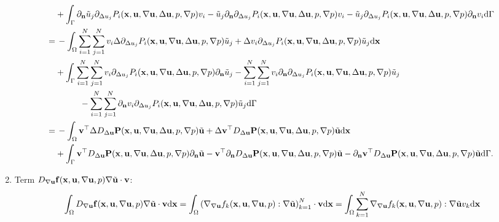 \documentclass[oneside]{book}
\numberwithin{equation}{section}
\begin{document}
\begin{enumerate}[leftmargin=0in]
\begin{align*}
        &+ \int_\Gamma \partial_{\bf n}\tilde{u}_j\partial_{\Delta u_j}P_i({\bf x},{\bf u},\nabla{\bf u},\Delta{\bf u},p,\nabla p)v_i - \tilde{u}_j\partial_{\bf n}\partial_{\Delta u_j}P_i({\bf x},{\bf u},\nabla{\bf u},\Delta{\bf u},p,\nabla p)v_i - \tilde{u}_j\partial_{\Delta u_j}P_i({\bf x},{\bf u},\nabla{\bf u},\Delta{\bf u},p,\nabla p)\partial_{\bf n}v_i{\rm d}\Gamma\\
        =&\, -\int_\Omega \sum_{i=1}^N\sum_{j=1}^N v_i\Delta\partial_{\Delta u_j}P_i({\bf x},{\bf u},\nabla{\bf u},\Delta{\bf u},p,\nabla p)\tilde{u}_j + \Delta v_i\partial_{\Delta u_j}P_i({\bf x},{\bf u},\nabla{\bf u},\Delta{\bf u},p,\nabla p)\tilde{u}_j{\rm d}{\bf x}\\
        &+ \int_\Gamma \sum_{i=1}^N\sum_{j=1}^N v_i\partial_{\Delta u_j}P_i({\bf x},{\bf u},\nabla{\bf u},\Delta{\bf u},p,\nabla p)\partial_{\bf n}\tilde{u}_j - \sum_{i=1}^N\sum_{j=1}^N v_i\partial_{\bf n}\partial_{\Delta u_j}P_i({\bf x},{\bf u},\nabla{\bf u},\Delta{\bf u},p,\nabla p)\tilde{u}_j\\
        &\hspace{1cm} - \sum_{i=1}^N\sum_{j=1}^N \partial_{\bf n}v_i\partial_{\Delta u_j}P_i({\bf x},{\bf u},\nabla{\bf u},\Delta{\bf u},p,\nabla p)\tilde{u}_j{\rm d}\Gamma\\
        =&\, -\int_\Omega {\bf v}^\top\Delta D_{\Delta{\bf u}}{\bf P}({\bf x},{\bf u},\nabla{\bf u},\Delta{\bf u},p,\nabla p)\tilde{\bf u} + \Delta{\bf v}^\top D_{\Delta{\bf u}}{\bf P}({\bf x},{\bf u},\nabla{\bf u},\Delta{\bf u},p,\nabla p)\tilde{\bf u}{\rm d}{\bf x}\\
        &+ \int_\Gamma {\bf v}^\top D_{\Delta{\bf u}}{\bf P}({\bf x},{\bf u},\nabla{\bf u},\Delta{\bf u},p,\nabla p)\partial_{\bf n}\tilde{\bf u} - {\bf v}^\top\partial_{\bf n}D_{\Delta{\bf u}}{\bf P}({\bf x},{\bf u},\nabla{\bf u},\Delta{\bf u},p,\nabla p)\tilde{\bf u} - \partial_{\bf n}{\bf v}^\top D_{\Delta{\bf u}}{\bf P}({\bf x},{\bf u},\nabla{\bf u},\Delta{\bf u},p,\nabla p)\tilde{\bf u}{\rm d}\Gamma.
    \end{align*}
    \item Term $D_{\nabla{\bf u}}{\bf f}({\bf x},{\bf u},\nabla{\bf u},p)\nabla\tilde{\bf u}\cdot{\bf v}$:
    \begin{align*}
        &\int_\Omega D_{\nabla{\bf u}}{\bf f}({\bf x},{\bf u},\nabla{\bf u},p)\nabla\tilde{\bf u}\cdot{\bf v}{\rm d}{\bf x} = \int_\Omega \left(\nabla_{\nabla{\bf u}}f_k({\bf x},{\bf u},\nabla{\bf u},p):\nabla\tilde{\bf u}\right)_{k=1}^N\cdot{\bf v}{\rm d}{\bf x} = \int_\Omega \sum_{k=1}^N \nabla_{\nabla{\bf u}}f_k({\bf x},{\bf u},\nabla{\bf u},p):\nabla\tilde{\bf u}v_k{\rm d}{\bf x}\\

\end{align*}
\end{enumerate}
\end{document}
